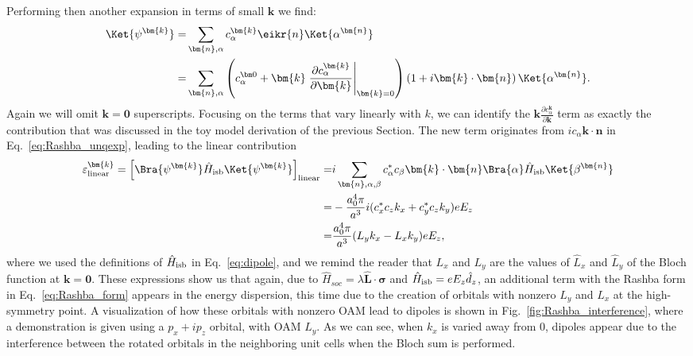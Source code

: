 Performing then another expansion in terms of small $\bm k$ we find:
\begin{align}
	\Ket{\psi^{\bm{k}}} =& \sum_{\bm{n},\alpha} c_\alpha^{\bm{k}} \eikr{n} \Ket{\alpha^{\bm{n}}}\\
	=& \sum_{\bm{n},\alpha} \left(c_\alpha^{\bm 0} + \bm{k}\left.\frac{\partial c_\alpha^{\bm{k}}}{\partial \bm{k}}\right\rvert_{\bm{k}=0} \right)\left(1 + i\bm{k}\cdot\bm{n}\right)\Ket{\alpha^{\bm{n}}}\label{eq:Rashba_unqexp}.
\end{align}
Again we will omit $\bm{k}=\bm 0$ superscripts.
Focusing on the terms that vary linearly with $k$, we can identify the $\bm k \frac{\partial c_\alpha^{\bm k}}{\partial \bm k}$ term as exactly the contribution that was discussed in the toy model derivation of the previous Section.
The new term originates from $ic_\alpha \bm k \cdot \bm n$ in Eq.~\eqref{eq:Rashba_unqexp}, leading to the linear contribution
\begin{align}
	\label{eq:d_z_from_OAM}
	\varepsilon^{\bm{k}}_{\rm linear} = \left[\Bra{\psi^{\bm{k}}} \hat{H}_{\rm isb} \Ket{\psi^{\bm{k}}}\right]_{\rm linear} =&  i\sum_{\bm{n},\alpha,\beta} c_\alpha^* c_\beta \bm{k}\cdot\bm{n}\Bra{\alpha} \hat{H}_{\rm isb} \Ket{\beta^{\bm{n}}}\\
	=&-\frac{a_0^4 \pi}{a^3}i(c^*_xc_zk_x + c^*_yc_z k_y) e E_z  \\
	=&\frac{a_0^4 \pi}{a^3}(L_y k_x - L_x k_y) e E_z,
\end{align}
where we used the definitions of $\hat{H}_{\rm isb}$ in Eq.~\eqref{eq:dipole}, and we remind the reader that $L_x$ and $L_y$ are the values of $\hat{L}_x$ and $\hat{L}_y$ of the Bloch function at $\bm k = \bm 0$.
These expressions show us that again, due to ${\hat{H}_{soc} = \lambda \hat{\bm{L}}\cdot\hat{\bm{\sigma}}}$ and $\hat{H}_{\rm isb} = e E_z \hat{d}_z$, an additional term with the Rashba form in Eq.~\eqref{eq:Rashba_form} appears in the energy dispersion, this time due to the creation of orbitals with nonzero $L_y$ and $L_x$ at the high-symmetry point.
A visualization of how these orbitals with nonzero \gls{OAM} lead to dipoles is shown in Fig.~\ref{fig:Rashba_interference}, where a demonstration is given using a $p_x + i p_z$ orbital, with \gls{OAM} $L_y$.
As we can see, when $k_x$ is varied away from 0, dipoles appear due to the interference between the rotated orbitals in the neighboring unit cells when the Bloch sum is performed.
